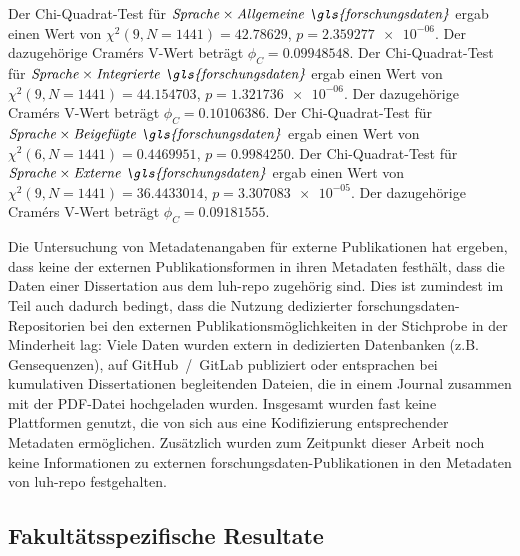 Der Chi-Quadrat-Test für $\text{\textit{Sprache}}\times\text{\textit{Allgemeine \gls{forschungsdaten}}}$ ergab einen Wert von $\chi^2 (\num{9}, N = \num{1441}) = \num[round-mode=places,round-precision=3]{42.78629}$, $p = \num[round-mode=places,round-precision=3]{2.359277e-06}$.
Der dazugehörige Cramérs V-Wert beträgt $\phi_C=\num[round-mode=places,round-precision=3]{0.09948548}$.
Der Chi-Quadrat-Test für $\text{\textit{Sprache}}\times\text{\textit{Integrierte \gls{forschungsdaten}}}$ ergab einen Wert von $\chi^2 (\num{9}, N = \num{1441}) = \num[round-mode=places,round-precision=3]{44.154703}$, $p = \num[round-mode=places,round-precision=3]{1.321736e-06}$.
Der dazugehörige Cramérs V-Wert beträgt $\phi_C=\num[round-mode=places,round-precision=3]{0.10106386}$.
Der Chi-Quadrat-Test für $\text{\textit{Sprache}}\times\text{\textit{Beigefügte \gls{forschungsdaten}}}$ ergab einen Wert von $\chi^2 (\num{6}, N = \num{1441}) = \num[round-mode=places,round-precision=3]{0.4469951}$, $p = \num[round-mode=places,round-precision=3]{0.9984250}$.
Der Chi-Quadrat-Test für $\text{\textit{Sprache}}\times\text{\textit{Externe \gls{forschungsdaten}}}$ ergab einen Wert von $\chi^2 (\num{9}, N = \num{1441}) = \num[round-mode=places,round-precision=3]{36.4433014}$, $p = \num[round-mode=places,round-precision=3]{3.307083e-05}$.
Der dazugehörige Cramérs V-Wert beträgt $\phi_C=\num[round-mode=places,round-precision=3]{0.09181555}$.

Die Untersuchung von Metadatenangaben für externe Publikationen hat ergeben, dass keine der externen Publikationsformen in ihren Metadaten festhält, dass die Daten einer Dissertation aus dem \gls{luh-repo} zugehörig sind.
Dies ist zumindest im Teil auch dadurch bedingt, dass die Nutzung dedizierter \gls{forschungsdaten}-Repositorien bei den externen Publikationsmöglichkeiten in der Stichprobe in der Minderheit lag:
Viele Daten wurden extern in dedizierten Datenbanken (z.B. Gensequenzen), auf GitHub~/~GitLab publiziert oder entsprachen bei kumulativen Dissertationen begleitenden Dateien, die in einem Journal zusammen mit der PDF-Datei hochgeladen wurden.
Insgesamt wurden fast keine Plattformen genutzt, die von sich aus eine Kodifizierung entsprechender Metadaten ermöglichen.
Zusätzlich wurden zum Zeitpunkt dieser Arbeit noch keine Informationen zu externen \gls{forschungsdaten}-Publikationen in den Metadaten von \gls{luh-repo} festgehalten.

\subsection{Fakultätsspezifische Resultate}\label{sec:luh-repo-results-specific}
